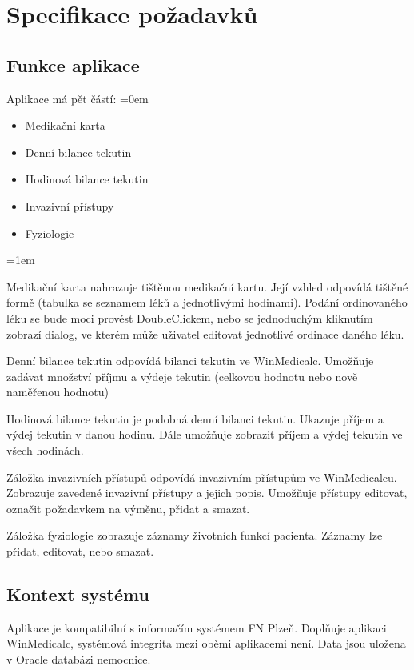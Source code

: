 \chapter{Specifikace požadavků}
\label{ch:specifikace}

\section{Funkce aplikace}

Aplikace má pět částí:
\parskip=0em
\begin{itemize}
	\item Medikační karta
	\item Denní bilance tekutin
	\item Hodinová bilance tekutin
	\item Invazivní přístupy
	\item Fyziologie
\end{itemize}
\parskip=1em

Medikační karta nahrazuje tištěnou medikační kartu. Její vzhled odpovídá tištěné formě (tabulka se seznamem léků a jednotlivými hodinami). Podání ordinovaného léku se bude moci provést DoubleClickem, nebo se jednoduchým kliknutím zobrazí dialog, ve kterém může uživatel editovat jednotlivé ordinace daného léku.

Denní bilance tekutin odpovídá bilanci tekutin ve WinMedicalc. Umožňuje zadávat množství příjmu a výdeje tekutin (celkovou hodnotu nebo nově naměřenou hodnotu)

Hodinová bilance tekutin je podobná denní bilanci tekutin. Ukazuje příjem a výdej tekutin v danou hodinu. Dále umožňuje zobrazit příjem a výdej tekutin ve všech hodinách.

Záložka invazivních přístupů odpovídá invazivním přístupům ve WinMedicalcu. Zobrazuje zavedené invazivní přístupy a jejich popis. Umožňuje přístupy editovat, označit požadavkem na výměnu, přidat a smazat.

Záložka fyziologie zobrazuje záznamy životních funkcí pacienta. Záznamy lze přidat, editovat, nebo smazat.


\section{Kontext systému}

Aplikace je kompatibilní s informačím systémem FN Plzeň. Doplňuje aplikaci WinMedicalc, systémová integrita mezi oběmi aplikacemi není. Data jsou uložena v Oracle databázi nemocnice.

